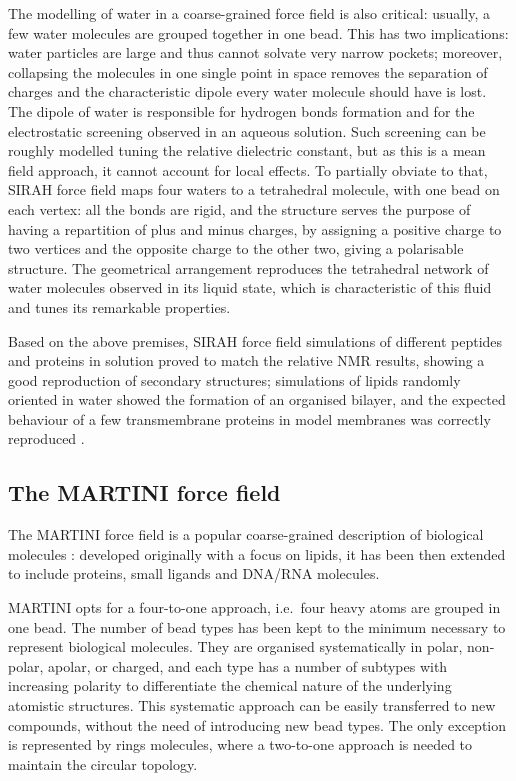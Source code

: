 The modelling of water in a coarse-grained force field is also critical: usually, a few water molecules are grouped together in one bead. This has two implications: water particles are large and thus cannot solvate very narrow pockets; moreover, collapsing the molecules in one single point in space removes the separation of charges and the characteristic dipole every water molecule should have is lost. The dipole of water is responsible for hydrogen bonds formation and for the electrostatic screening observed in an aqueous solution. Such screening can be roughly modelled tuning the relative dielectric constant, but as this is a mean field approach, it cannot account for local effects.
%
To partially obviate to that, SIRAH force field maps four waters to a tetrahedral molecule, with one bead on each vertex: all the bonds are rigid, and the structure serves the purpose of having a repartition of plus and minus charges, by assigning a positive charge to two vertices and the opposite charge to the other two, giving a polarisable structure. The geometrical arrangement reproduces the tetrahedral network of water molecules observed in its liquid state, which is characteristic of this fluid and tunes its remarkable properties.

Based on the above premises, SIRAH force field simulations of different peptides and proteins in solution proved to match the relative NMR results, showing a good reproduction of secondary structures; simulations of lipids randomly oriented in water showed the formation of an organised bilayer, and the expected behaviour of a few transmembrane proteins in model membranes was correctly reproduced \citep{Machado2018,Barrera2019}.

 
\subsection{The MARTINI force field}

The MARTINI force field is a popular coarse-grained description of biological molecules \citep{Marrink2007,Monticelli2008,DeJong2013}: developed originally with a focus on lipids, it has been then extended to include proteins, small ligands and DNA/RNA molecules.

MARTINI opts for a four-to-one approach, i.e.\ four heavy atoms are grouped in one bead. The number of bead types has been kept to the minimum necessary to represent biological molecules. They are organised systematically in polar, non-polar, apolar, or charged, and each type has a number of subtypes with increasing polarity to differentiate the chemical nature of the underlying atomistic structures.
%
This systematic approach can be easily transferred to new compounds, without the need of introducing new bead types.
%
The only exception is represented by rings molecules, where a two-to-one approach is needed to maintain the circular topology.

